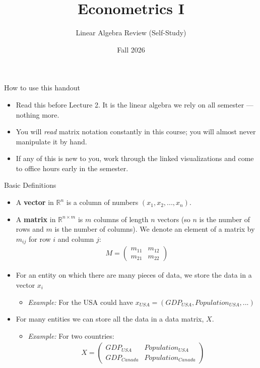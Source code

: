 \documentclass[aspectratio=169,11pt]{beamer}
\begin{document}
\title{Econometrics I}
\subtitle{Linear Algebra Review (Self-Study)}
\date{Fall 2026}
\maketitle

\begin{frame}{How to use this handout}
\begin{itemize}
	\item Read this before Lecture 2. It is the linear algebra we rely on all semester --- nothing more.
	\item You will \emph{read} matrix notation constantly in this course; you will almost never manipulate it by hand.
	\item If any of this is new to you, work through the linked visualizations and come to office hours early in the semester.
\end{itemize}
\end{frame}

\begin{frame}{Basic Definitions}
\begin{itemize}
	\item A {\bf vector} in $\mathbb{R}^n$ is a column of numbers $(x_1,x_2,...,x_n)$.
	\item A {\bf matrix} in $\mathbb{R}^{n\times m}$ is $m$ columns of length $n$ vectors (so $n$ is the number of rows and $m$ is the number of columns). We denote an element of a matrix by $m_{ij}$ for row $i$ and column $j$:
	\begin{align*}
		M = \left(\begin{array}{cc}
			m_{11} & m_{12}\\
			m_{21} & m_{22}
		\end{array}\right)
	\end{align*}
	\item For an entity on which there are many pieces of data, we store the data in a vector $x_i$
	\begin{itemize}
		\item[]\emph{Example:} For the USA could have $x_{USA} = \left(GDP_{USA}, Population_{USA},...\right)$
	\end{itemize}
	\item For many entities we can store all the data in a data matrix, $X$.
	\begin{itemize}
		\item[]\emph{Example:} For two countries:
			\begin{align*}
		X = \left(\begin{array}{ll}
			GDP_{USA} & Population_{USA}\\
			GDP_{Canada} & Population_{Canada}
		\end{array}\right)
			\end{align*}
	\end{itemize}
\end{itemize}

\end{frame}
\end{document}
